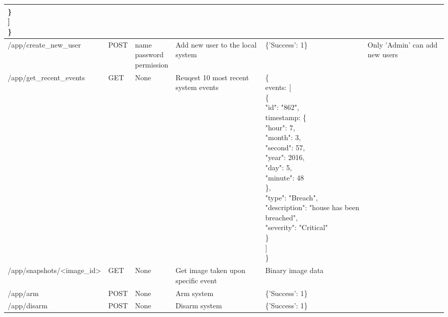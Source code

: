 \documentclass[10pt]{article}
\begin{document}
\begin{table}[ht]
{\begin{tabular}{| l | l | l | p{3cm} | p{6.5cm} | l |}
{             		\qquad \quad \} \\ 
             	\qquad ] \\ 
             \quad \} \\
           } & \\ \hline
     /app/create\_new\_user & POST & \pbox{25cm}{name \\ password \\ permission} & Add new user to the local system & \{'Success': 1\} & Only 'Admin' can add new users \\ \hline
     /app/get\_recent\_events & GET & None & Reuqest 10 most recent system events & \pbox{25cm}{\{ \\ 
             	\quad events: [ \\ 
             		\qquad \{ \\ 
             		\qquad \quad "id": "862", \\
             			\qquad \quad timestamp: \{ \\ 
             				\qquad \quad \quad "hour": 7, \\ 
       					    \qquad \quad \quad "month": 3, \\ 
                            \qquad \quad \quad "second": 57, \\ 
             				\qquad \quad \quad "year": 2016, \\ 
             				\qquad \quad \quad "day": 5, \\ 
             				\qquad \quad \quad "minute": 48 \\ 
             			\qquad \quad \}, \\ 
             			\qquad \quad "type": "Breach", \\ 
             			\qquad \quad "description": "house has been breached", \\ 
             			\qquad \quad "severity": "Critical" \\ 
             		\qquad \quad \} \\ 
             	\qquad ] \\ 
             \quad \} \\
           } & \\ \hline
	/app/snapshots/<image\_id> & GET & None & Get image taken upon specific event & Binary image data & \\ \hline
	/app/arm & POST & None & Arm system & \{'Success': 1\} & \\ \hline
	/app/disarm & POST & None & Disarm system & \{'Success': 1\} & \\ \hline

\end{tabular}}
\end{table}
\end{document}
